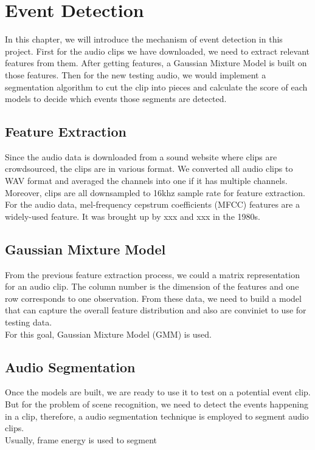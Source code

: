 \chapter{Event Detection}
In this chapter, we will introduce the mechanism of event detection in this project. First for the audio clips we have downloaded, we need to extract relevant features from them. After getting features, a Gaussian Mixture Model is built on those features. Then for the new testing audio, we would implement a segmentation algorithm to cut the clip into pieces and calculate the score of each models to decide which events those segments are detected.   
\section{Feature Extraction}
Since the audio data is downloaded from a sound website where clips are crowdsourced, the clips are in various format. We converted all audio clips to WAV format and averaged the channels into one if it has multiple channels. Moreover, clips are all downsampled to 16khz sample rate for feature extraction.\\ 
For the audio data, mel-frequency cepstrum coefficients (MFCC) features are a widely-used feature. It was brought up by xxx and xxx in the 1980s. 

\section{Gaussian Mixture Model}
From the previous feature extraction process, we could a matrix representation for an audio clip. The column number is the dimension of the features and one row corresponds to one observation. From these data, we need to build a model that can capture the overall feature distribution and also are conviniet to use for testing data.\\
For this goal, Gaussian Mixture Model (GMM) is used. 

\section{Audio Segmentation}
Once the models are built, we are ready to use it to test on a potential event clip. But for the problem of scene recognition, we need to detect the   events happening in a clip, therefore, a audio segmentation technique is employed to segment audio clips. \\ 
Usually, frame energy is used to segment 
